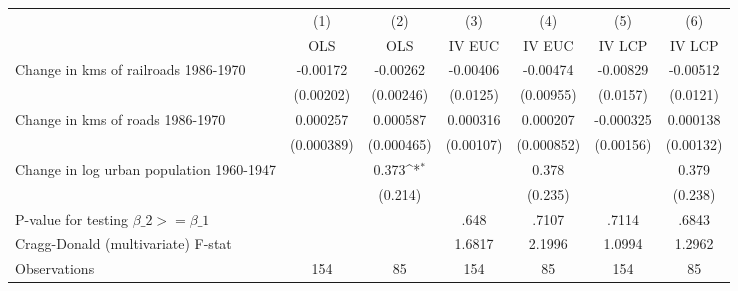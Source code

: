{
\def\sym#1{\ifmmode^{#1}\else\(^{#1}\)\fi}
\begin{tabular}{l*{6}{c}}
\hline\hline
                &\multicolumn{1}{c}{(1)}&\multicolumn{1}{c}{(2)}&\multicolumn{1}{c}{(3)}&\multicolumn{1}{c}{(4)}&\multicolumn{1}{c}{(5)}&\multicolumn{1}{c}{(6)}\\
                &\multicolumn{1}{c}{OLS}&\multicolumn{1}{c}{OLS}&\multicolumn{1}{c}{IV EUC}&\multicolumn{1}{c}{IV EUC}&\multicolumn{1}{c}{IV LCP}&\multicolumn{1}{c}{IV LCP}\\
\hline
Change in kms of railroads 1986-1970& -0.00172         & -0.00262         & -0.00406         & -0.00474         & -0.00829         & -0.00512         \\
                &(0.00202)         &(0.00246)         & (0.0125)         &(0.00955)         & (0.0157)         & (0.0121)         \\
[1em]
Change in kms of roads 1986-1970& 0.000257         & 0.000587         & 0.000316         & 0.000207         &-0.000325         & 0.000138         \\
                &(0.000389)         &(0.000465)         &(0.00107)         &(0.000852)         &(0.00156)         &(0.00132)         \\
[1em]
Change in log urban population 1960-1947&                  &    0.373\sym{*}  &                  &    0.378         &                  &    0.379         \\
                &                  &  (0.214)         &                  &  (0.235)         &                  &  (0.238)         \\
\hline
P-value for testing $\beta\_{2} >= \beta\_{1}$&                  &                  &     .648         &    .7107         &    .7114         &    .6843         \\
Cragg-Donald (multivariate) F-stat&                  &                  &   1.6817         &   2.1996         &   1.0994         &   1.2962         \\
Observations    &      154         &       85         &      154         &       85         &      154         &       85         \\
\hline\hline
\end{tabular}
}
